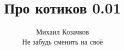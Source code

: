 \documentclass[]{beamer}
\begin{document}
\title{Про котиков 0.01}
\author{Михаил Козачков\\Не забудь сменить на своё}
\maketitle
\end{document}
